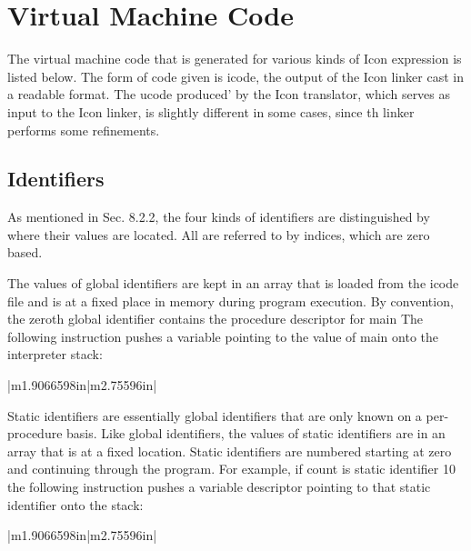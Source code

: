 \chapter{Virtual Machine Code}

The virtual machine code that is generated for various kinds of Icon
expression is listed below. The form of code given is icode, the
output of the Icon linker cast in a readable format. The ucode
produced' by the Icon translator, which serves as input to the Icon
linker, is slightly different in some cases, since th linker performs
some refinements.

\section{Identifiers}

As mentioned in Sec. 8.2.2, the four kinds of identifiers are
distinguished by where their values are located. All are referred to
by indices, which are zero based.


The values of global identifiers are kept in an array that is loaded
from the icode file and is at a fixed place in memory during program
execution. By convention, the zeroth global identifier contains the
procedure descriptor for main The following instruction pushes a
variable pointing to the value of main onto the interpreter stack:

\begin{flushleft}
\tablelasttail{\hline}
\begin{xtabular}{|m{1.9066598in}|m{2.75596in}|}

\end{xtabular}
\end{flushleft}

Static identifiers are essentially global identifiers that are only
known on a per-procedure basis. Like global identifiers, the values of
static identifiers are in an array that is at a fixed location. Static
identifiers are numbered starting at zero and continuing through the
program. For example, if count is static identifier 10 the following
instruction pushes a variable descriptor pointing to that static
identifier onto the stack:

\begin{flushleft}
\tablelasttail{\hline}
\begin{xtabular}{|m{1.9066598in}|m{2.75596in}|}

\end{xtabular}
\end{flushleft}


